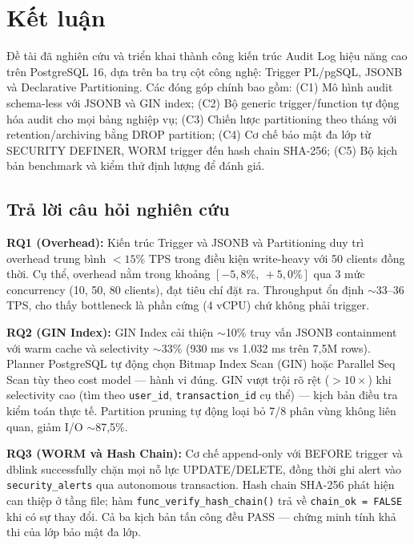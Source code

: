 \section{Kết luận}

Đề tài đã nghiên cứu và triển khai thành công kiến trúc Audit Log hiệu năng cao trên PostgreSQL 16, dựa trên ba trụ cột công nghệ: Trigger PL/pgSQL, JSONB và Declarative Partitioning. Các đóng góp chính bao gồm: (C1) Mô hình audit schema-less với JSONB và GIN index; (C2) Bộ generic trigger/function tự động hóa audit cho mọi bảng nghiệp vụ; (C3) Chiến lược partitioning theo tháng với retention/archiving bằng DROP partition; (C4) Cơ chế bảo mật đa lớp từ SECURITY DEFINER, WORM trigger đến hash chain SHA-256; (C5) Bộ kịch bản benchmark và kiểm thử định lượng để đánh giá.

\subsection{Trả lời câu hỏi nghiên cứu}

\textbf{RQ1 (Overhead):} Kiến trúc Trigger và JSONB và Partitioning duy trì overhead trung bình $< 15\%$ TPS trong điều kiện write-heavy với 50 clients đồng thời. Cụ thể, overhead nằm trong khoảng $[-5,8\%,\ +5,0\%]$ qua 3 mức concurrency (10, 50, 80 clients), đạt tiêu chí đặt ra. Throughput ổn định $\sim$33--36 TPS, cho thấy bottleneck là phần cứng (4 vCPU) chứ không phải trigger.

\textbf{RQ2 (GIN Index):} GIN Index cải thiện $\sim$10\% truy vấn JSONB containment với warm cache và selectivity $\sim$33\% (930 ms vs 1.032 ms trên 7,5M rows). Planner PostgreSQL tự động chọn Bitmap Index Scan (GIN) hoặc Parallel Seq Scan tùy theo cost model --- hành vi đúng. GIN vượt trội rõ rệt ($>10\times$) khi selectivity cao (tìm theo \texttt{user\_id}, \texttt{transaction\_id} cụ thể) --- kịch bản điều tra kiểm toán thực tế. Partition pruning tự động loại bỏ 7/8 phân vùng không liên quan, giảm I/O $\sim$87,5\%.

\begin{sloppypar}\textbf{RQ3 (WORM và Hash Chain):} Cơ chế append-only với BEFORE trigger và dblink successfully chặn mọi nỗ lực UPDATE/DELETE, đồng thời ghi alert vào \texttt{security\_alerts} qua autonomous transaction. Hash chain SHA-256 phát hiện can thiệp ở tầng file; hàm \texttt{func\_verify\_hash\_chain()} trả về \texttt{chain\_ok = FALSE} khi có sự thay đổi. Cả ba kịch bản tấn công đều PASS --- chứng minh tính khả thi của lớp bảo mật đa lớp.\end{sloppypar}

